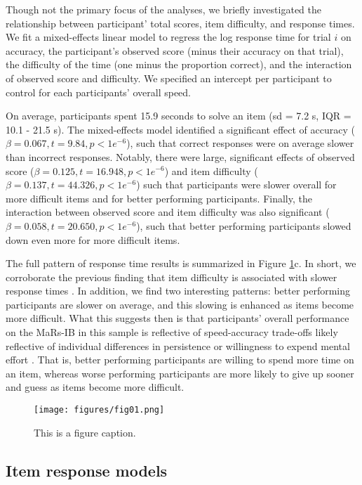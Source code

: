 \documentclass[a4paper,man,natbib]{apa6}
\begin{document}
Though not the primary focus of the analyses, we briefly investigated the relationship between participant' total scores, item difficulty, and response times. We fit a mixed-effects linear model to regress the log response time for trial $i$ on accuracy, the participant's observed score (minus their accuracy on that trial), the difficulty of the time (one minus the proportion correct), and the interaction of observed score and difficulty. We specified an intercept per participant to control for each participants' overall speed. 

On average, participants spent 15.9 seconds to solve an item (sd = 7.2 s, IQR = 10.1 - 21.5 s). The mixed-effects model identified a significant effect of accuracy ($\beta = 0.067, t = 9.84, p < 1e^{-6}$), such that correct responses were on average slower than incorrect responses. Notably, there were large, significant effects of observed score ($\beta = 0.125, t = 16.948, p < 1e^{-6}$) and item difficulty ($\beta = 0.137, t = 44.326, p < 1e^{-6}$) such that participants were slower overall for more difficult items and for better performing participants. Finally, the interaction between observed score and item difficulty was also significant ($\beta = 0.058, t = 20.650, p < 1e^{-6}$), such that better performing participants slowed down even more for more difficult items. 

The full pattern of response time results is summarized in Figure \ref{fig:fig01}c. In short, we corroborate the previous finding that item difficulty is associated with slower response times \citep{chierchia2019matrix}. In addition, we find two interesting patterns: better performing participants are slower on average, and this slowing is enhanced as items become more difficult. What this suggests then is that participants' overall performance on the MaRs-IB in this sample is reflective of speed-accuracy trade-offs likely reflective of individual differences in persistence or willingness to expend mental effort \citep{ranger2021effects}. That is, better performing participants are willing to spend more time on an item, whereas worse performing participants are more likely to give up sooner and guess as items become more difficult.  

\begin{figure}
\centering
\texttt{[image: figures/fig01.png]}
\caption{\label{fig:fig01}This is a figure caption.}
\end{figure}
 
\subsection{Item response models}
\end{document}
